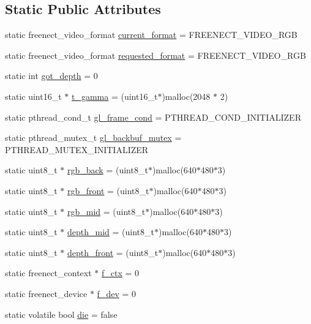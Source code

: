 \subsection*{Static Public Attributes}
\begin{DoxyCompactItemize}
\item 
static freenect\+\_\+video\+\_\+format \hyperlink{class_the_device_a4461a50305403bef90cd2c8ed3abe887}{current\+\_\+format} = F\+R\+E\+E\+N\+E\+C\+T\+\_\+\+V\+I\+D\+E\+O\+\_\+\+R\+G\+B
\item 
static freenect\+\_\+video\+\_\+format \hyperlink{class_the_device_a36b600c96ef49a9d585e641c034fee40}{requested\+\_\+format} = F\+R\+E\+E\+N\+E\+C\+T\+\_\+\+V\+I\+D\+E\+O\+\_\+\+R\+G\+B
\item 
static int \hyperlink{class_the_device_a998f82ad80842ecb61506eb373290a6e}{got\+\_\+depth} = 0
\item 
static uint16\+\_\+t $\ast$ \hyperlink{class_the_device_afc5f9b8496261c692b5b42d0bf4fe564}{t\+\_\+gamma} = (uint16\+\_\+t$\ast$)malloc(2048 $\ast$ 2)
\item 
static pthread\+\_\+cond\+\_\+t \hyperlink{class_the_device_abe546632e82af214d61db8d9d04a288d}{gl\+\_\+frame\+\_\+cond} = P\+T\+H\+R\+E\+A\+D\+\_\+\+C\+O\+N\+D\+\_\+\+I\+N\+I\+T\+I\+A\+L\+I\+Z\+E\+R
\item 
static pthread\+\_\+mutex\+\_\+t \hyperlink{class_the_device_a4c323578c55eb1579d502ac00a646f48}{gl\+\_\+backbuf\+\_\+mutex} = P\+T\+H\+R\+E\+A\+D\+\_\+\+M\+U\+T\+E\+X\+\_\+\+I\+N\+I\+T\+I\+A\+L\+I\+Z\+E\+R
\item 
static uint8\+\_\+t $\ast$ \hyperlink{class_the_device_a891e436e57a14948d2a86f7b0176d4c6}{rgb\+\_\+back} = (uint8\+\_\+t$\ast$)malloc(640$\ast$480$\ast$3)
\item 
static uint8\+\_\+t $\ast$ \hyperlink{class_the_device_a996a11e8402b9ac9893a8ff7de033a28}{rgb\+\_\+front} = (uint8\+\_\+t$\ast$)malloc(640$\ast$480$\ast$3)
\item 
static uint8\+\_\+t $\ast$ \hyperlink{class_the_device_a9f2536b80117cf3b969b5b73dfcda9c9}{rgb\+\_\+mid} = (uint8\+\_\+t$\ast$)malloc(640$\ast$480$\ast$3)
\item 
static uint8\+\_\+t $\ast$ \hyperlink{class_the_device_a2b13e5d032110be8e42657f496bbbec8}{depth\+\_\+mid} = (uint8\+\_\+t$\ast$)malloc(640$\ast$480$\ast$3)
\item 
static uint8\+\_\+t $\ast$ \hyperlink{class_the_device_a28a01b250bdc6ca42383a69cdd71e4d4}{depth\+\_\+front} = (uint8\+\_\+t$\ast$)malloc(640$\ast$480$\ast$3)
\item 
static freenect\+\_\+context $\ast$ \hyperlink{class_the_device_ac9679edd0e49b43515712cabf1644f9a}{f\+\_\+ctx} = 0
\item 
static freenect\+\_\+device $\ast$ \hyperlink{class_the_device_a1ac2bb1c0f50ef433c645d05be0f4c43}{f\+\_\+dev} = 0
\item 
static volatile bool \hyperlink{class_the_device_ab301f4e54b7f298be586b6a119dbf9db}{die} = false
\end{DoxyCompactItemize}


